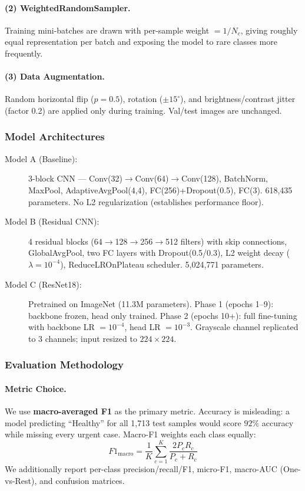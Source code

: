 \documentclass[11pt, letterpaper]{article}
\begin{document}
\paragraph{(2) WeightedRandomSampler.}
Training mini-batches are drawn with per-sample weight $= 1/N_c$, giving
roughly equal representation per batch and exposing the model to rare
classes more frequently.

\paragraph{(3) Data Augmentation.}
Random horizontal flip ($p{=}0.5$), rotation ($\pm15^{\circ}$), and
brightness/contrast jitter (factor 0.2) are applied only during training.
Val/test images are unchanged.

\subsubsection{Model Architectures}

\begin{description}
  \item[Model A (Baseline):] 3-block CNN --- Conv(32)$\to$Conv(64)$\to$Conv(128),
    BatchNorm, MaxPool, AdaptiveAvgPool(4,4), FC(256)+Dropout(0.5), FC(3).
    618{,}435 parameters. No L2 regularization (establishes performance floor).

  \item[Model B (Residual CNN):] 4 residual blocks (64$\to$128$\to$256$\to$512
    filters) with skip connections, GlobalAvgPool, two FC layers with
    Dropout(0.5/0.3), L2 weight decay ($\lambda = 10^{-4}$),
    ReduceLROnPlateau scheduler. 5{,}024{,}771 parameters.

  \item[Model C (ResNet18):] Pretrained on ImageNet (11.3M parameters).
    Phase 1 (epochs 1--9): backbone frozen, head only trained.
    Phase 2 (epochs 10+): full fine-tuning with backbone LR $= 10^{-4}$,
    head LR $= 10^{-3}$. Grayscale channel replicated to 3 channels;
    input resized to $224\times224$.
\end{description}

\subsubsection{Evaluation Methodology}
\label{subsubsec:eval_method}

\paragraph{Metric Choice.}
We use \textbf{macro-averaged F1} as the primary metric.
Accuracy is misleading: a model predicting ``Healthy'' for all 1,713 test
samples would score $92\%$ accuracy while missing every urgent case.
Macro-F1 weights each class equally:
\begin{equation}
  F1_{\text{macro}} = \frac{1}{K}\sum_{c=1}^{K}
  \frac{2 P_c R_c}{P_c + R_c}
\end{equation}
We additionally report per-class precision/recall/F1, micro-F1,
macro-AUC (One-vs-Rest), and confusion matrices.
\end{document}
